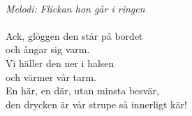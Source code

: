 \\
{\footnotesize\textit{Melodi: Flickan hon går i ringen}}\\
\\
Ack, glöggen den står på bordet\\
och ångar sig varm.\\
Vi häller den ner i halsen \\
och värmer vår tarm.\\
En här, en där, utan minsta besvär,\\
den drycken är vår strupe så innerligt kär!
